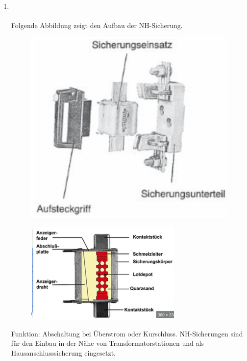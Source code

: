\begin{enumerate}
    \item   {}\\\\
            Folgende Abbildung zeigt den Aufbau der NH-Sicherung.
            \begin{figure}[!htp]
                \centering
                \includegraphics[scale = 0.3]{img/NH_Aufbau.png}
            \end{figure}
            \begin{figure}[!htp]
                \centering
                \includegraphics[scale = 0.7]{img/NH_Aufbau_real.PNG}
            \end{figure}

            Funktion: Abschaltung bei Überstrom oder Kurschluss. NH-Sicherungen sind für den Einbau in der Nähe von Transformatorstationen 
            und als Hausanschlusssicherung eingesetzt.


\end{enumerate}
